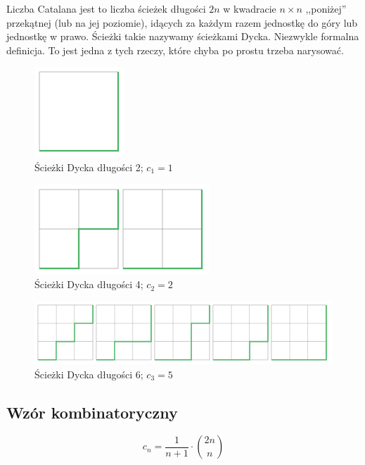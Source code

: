 Liczba Catalana jest to liczba ścieżek długości $2n$ w kwadracie $n \times n$ ,,poniżej'' przekątnej (lub na jej poziomie), idących za każdym razem jednostkę do góry lub jednostkę w prawo. Ścieżki takie nazywamy ścieżkami Dycka. Niezwykle formalna definicja. To jest jedna z tych rzeczy, które chyba po prostu trzeba narysować.

\begin{figure}[h]
	\centering
	\includegraphics[scale=0.5]{images/catalan/all_paths_1.png}
	\caption{Ścieżki Dycka długości 2; $c_1 = 1$}
\end{figure}

\begin{figure}[h]
	\centering
	\includegraphics[scale=0.5]{images/catalan/all_paths_2.png}
	\caption{Ścieżki Dycka długości 4; $c_2 = 2$}
\end{figure}

\begin{figure}[ht]
	\centering
	\includegraphics[scale=0.5]{images/catalan/all_paths_3.png}
	\caption{Ścieżki Dycka długości 6; $c_3 = 5$}
\end{figure}


\subsection{Wzór kombinatoryczny}
\begin{theorem}
	\begin{equation}
		c_n = \frac{1}{n+1} \cdot \binom{2n}{n}
	\end{equation}
\end{theorem}

